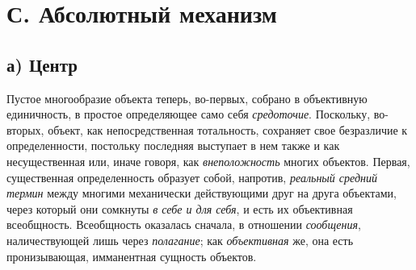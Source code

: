 \section[С. Абсолютный механизм]{С. Абсолютный механизм}
\subsection[а) Центр]{а) Центр}
Пустое многообразие объекта теперь, во-первых, собрано в
объективную единичность, в простое определяющее само себя
{\em средоточие}.
Поскольку, во-вторых, объект, как непосредственная
тотальность, сохраняет свое безразличие к определенности, постольку
последняя выступает в нем также и как несущественная или, иначе говоря, как
{\em внеположность}
многих объектов. Первая, существенная определенность образует
собой, напротив, {\em реальный средний
термин} между многими механически действующими друг на друга
объектами, через который они сомкнуты
{\em в себе и для себя},
и есть их объективная всеобщность. Всеобщность оказалась
сначала, в отношении {\em сообщения},
наличествующей лишь через
{\em полагание}; как
{\em объективная} же, она
есть пронизывающая, имманентная сущность объектов.


